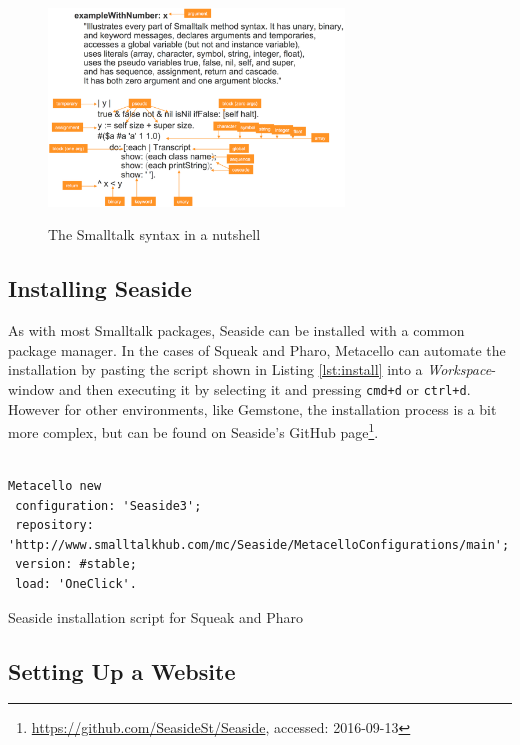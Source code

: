 \documentclass[a4paper,12pt,pagesize,headsepline,oribibl,titlepage]{scrartcl}
\begin{document}
\begin{figure}[h]
\begin{center}
\includegraphics*[width=0.7\textwidth]{images/syntax.png}\\
\caption{The Smalltalk syntax in a nutshell}
\label{fig:syntax}
\end{center}
\end{figure}

\subsection{Installing Seaside}

As with most Smalltalk packages, Seaside can be installed with a common package manager. In the cases of Squeak and Pharo, Metacello can automate the installation by pasting the script shown in Listing \ref{lst:install} into a \emph{Workspace}-window and then executing it by selecting it and pressing \texttt{cmd+d} or \texttt{ctrl+d}. However for other environments, like Gemstone, the installation process is a bit more complex, but can be found on Seaside's GitHub page\footnote{\url{https://github.com/SeasideSt/Seaside}, accessed: 2016-09-13}.

\begin{listing}[]%
\begin{verbatim}

Metacello new
 configuration: 'Seaside3';
 repository: 'http://www.smalltalkhub.com/mc/Seaside/MetacelloConfigurations/main';
 version: #stable;
 load: 'OneClick'.

\end{verbatim}
\caption{Seaside installation script for Squeak and Pharo}
\label{lst:install}
\end{listing}

\subsection{Setting Up a Website}
\end{document}
